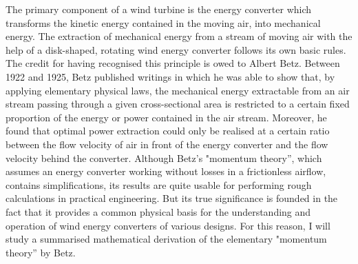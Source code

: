 %
%
%
%
%


The primary component of a wind turbine is the energy converter which transforms the kinetic energy contained in the moving air, into mechanical energy. The extraction of mechanical energy from a stream of moving air with the help of a disk-shaped, rotating wind energy converter follows its own basic rules.
The credit for having recognised this principle is owed to Albert Betz. Between 1922 and 1925, Betz published writings in which he was able to show that, by applying elementary physical laws, the mechanical energy extractable from an air stream passing through a given cross-sectional area is restricted to a certain fixed proportion of the energy or power contained in the air stream. Moreover, he found that optimal power extraction could only be realised at a certain ratio between the flow velocity of air in front of the energy converter and the flow velocity behind the converter.
Although Betz’s "momentum theory”, which assumes an energy converter working without losses in a frictionless airflow, contains simplifications, its results are quite usable for performing rough calculations in practical engineering. But its true significance is founded in the fact that it provides a common physical basis for the understanding and operation of wind energy converters of various designs. For this reason, I will study a summarised mathematical derivation of the elementary "momentum theory” by Betz.

